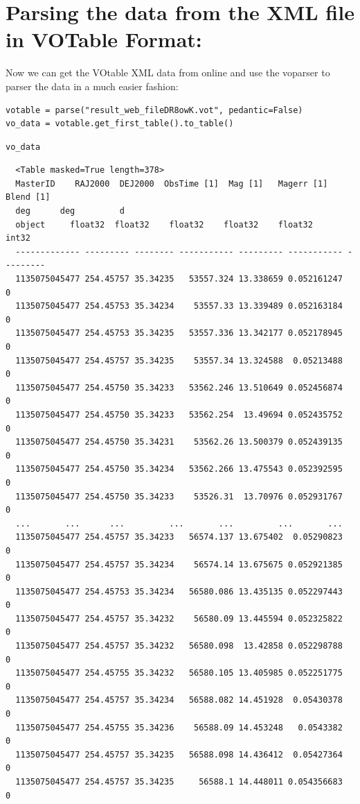 \documentclass[11pt]{article}
\begin{document}
\section*{Parsing the data from the XML file in VOTable Format:}
\label{sec-5}

Now we can get the VOtable XML data from online and use the voparser to parser
the data in a much easier fashion:

\begin{verbatim}
votable = parse("result_web_fileDR8owK.vot", pedantic=False)
vo_data = votable.get_first_table().to_table()
\end{verbatim}


\begin{verbatim}
vo_data
\end{verbatim}

\begin{verbatim}
  <Table masked=True length=378>
  MasterID    RAJ2000  DEJ2000  ObsTime [1]  Mag [1]   Magerr [1] Blend [1]
  deg      deg         d
  object     float32  float32    float32    float32    float32     int32
  ------------- --------- -------- ----------- --------- ----------- ---------
  1135075045477 254.45757 35.34235   53557.324 13.338659 0.052161247         0
  1135075045477 254.45753 35.34234    53557.33 13.339489 0.052163184         0
  1135075045477 254.45753 35.34235   53557.336 13.342177 0.052178945         0
  1135075045477 254.45757 35.34235    53557.34 13.324588  0.05213488         0
  1135075045477 254.45750 35.34233   53562.246 13.510649 0.052456874         0
  1135075045477 254.45750 35.34233   53562.254  13.49694 0.052435752         0
  1135075045477 254.45750 35.34231    53562.26 13.500379 0.052439135         0
  1135075045477 254.45750 35.34234   53562.266 13.475543 0.052392595         0
  1135075045477 254.45750 35.34233    53526.31  13.70976 0.052931767         0
  ...       ...      ...         ...       ...         ...       ...
  1135075045477 254.45757 35.34233   56574.137 13.675402  0.05290823         0
  1135075045477 254.45757 35.34234    56574.14 13.675675 0.052921385         0
  1135075045477 254.45753 35.34234   56580.086 13.435135 0.052297443         0
  1135075045477 254.45757 35.34232    56580.09 13.445594 0.052325822         0
  1135075045477 254.45757 35.34232   56580.098  13.42858 0.052298788         0
  1135075045477 254.45755 35.34232   56580.105 13.405985 0.052251775         0
  1135075045477 254.45757 35.34234   56588.082 14.451928  0.05430378         0
  1135075045477 254.45755 35.34236    56588.09 14.453248   0.0543382         0
  1135075045477 254.45757 35.34235   56588.098 14.436412  0.05427364         0
  1135075045477 254.45757 35.34235     56588.1 14.448011 0.054356683         0
\end{verbatim}
\end{document}

